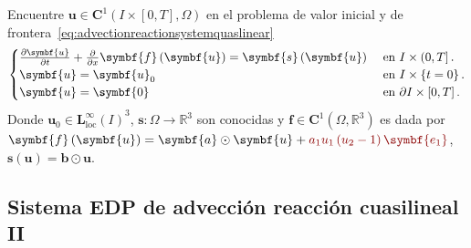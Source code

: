 Encuentre
\begin{math}
	\symbf{u}\in
	\symbf{C}^{1}\left(I\times\left[0,T\right],\Omega\right)
\end{math}
en el problema de valor inicial y de frontera~\eqref{eq:advectionreactionsystemquaslinear}
\begin{equation}\label{eq:advectionreactionsystemquaslinear}
	\begin{cases}
		\diffp{\symbf{u}}{t}+\diffp{}{x}\symbf{f}\left(\symbf{u}\right)=
		\symbf{s}\left(\symbf{u}\right) & \text{ en }I\times\left(0,T\right].          \\
		\symbf{u}                                                      =
		\symbf{u}_{0}                   & \text{ en }I\times\left\{t=0\right\}.        \\
		\symbf{u}                                                      =
		\symbf{0}                       & \text{ en }\partial I\times\left[0,T\right].
	\end{cases}
\end{equation}
Donde
\begin{math}
	\symbf{u}_{0}\in
	{\symbf{L}^{\infty}_{\text{loc}}\left(I\right)}^{3}
\end{math},
\begin{math}
	\symbf{s}\colon\Omega\to
	\mathbb{R}^{3}
\end{math}
son conocidas y
\begin{math}
	\symbf{f}\in
	\symbf{C}^{1}\left(\Omega,\mathbb{R}^{3}\right)
\end{math}
es dada por
\begin{math}
	\symbf{f}\left(\symbf{u}\right)=
	\symbf{a}\odot\symbf{u}+
	\mathcolor{DarkRed}{a_{1}u_{1}\left(u_{2}-1\right)\symbf{e_{1}}}
\end{math},
\begin{math}
	\symbf{s}\left(\symbf{u}\right)=
	\symbf{b}\odot\symbf{u}
\end{math}.

\subsection*{Sistema EDP de advección reacción cuasilineal II}

